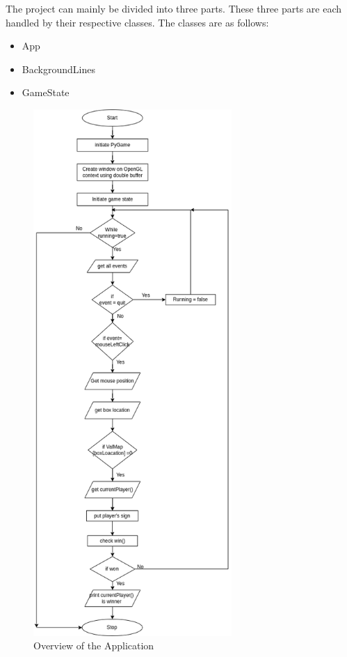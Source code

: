 \documentclass[12pt]{article}
\begin{document}
The project can mainly be divided into three parts. These three parts are each handled by their respective classes. The classes are as follows:
\begin{itemize}
    \item App
    \item BackgroundLines
    \item GameState
\end{itemize}

\clearpage
\begin{figure}[h]
    \centerline{\includegraphics[height=200mm]{TicTacToeHighLevelFlowchart.png}}
    \caption{Overview of the Application}
    \label{fig}
\end{figure}

\clearpage
\end{document}
